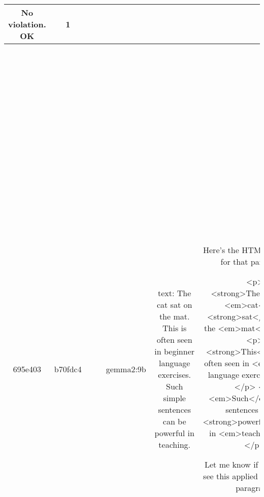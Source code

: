 \begin{table}[h!]
\begin{tabular}{|c|c|c|c|c|c|c|c|c|c|}
No violation.
OK & 1\\
\hline
695e403 & b70fdc4 &  &  & gemma2:9b & text: The cat sat on the mat. This is often seen in beginner language exercises. Such simple sentences can be powerful in teaching. & Here's the HTML formatting for that paragraph:

<p><strong>The</strong> <em>cat</em> <strong>sat</strong> on the <em>mat</em>.</p>
<p><strong>This</strong> is often seen in <em>beginner language exercises</em>.</p>
<p><em>Such</em> simple sentences can be <strong>powerful</strong> in <em>teaching</em>.</p>  


Let me know if you'd like to see this applied to a different paragraph! & ok & The evaluation of the chatbot output is as follows:

1. The chatbot's description specifies that each sentence in a paragraph should be wrapped in a `<p>` tag.
2. The output contains three `<p>` tags, each containing a single sentence. This satisfies the description's requirement for having at least three `<p>` tags.
3. Each `<p>` tag includes a `<strong>` tag and multiple `<em>` tags, which aligns with the requirement to emphasize key words and phrases inside each sentence.

Therefore, the chatbot output complies with the description provided. 

OK & 1\\
\hline
5907de9 & b70fdc4 &  &  & gemma2:9b & text: In a distant land, there was a great kingdom. The king ruled with fairness and wisdom. People in his kingdom were happy and prosperous. & <p><strong>In</strong> a **distant** <em>land</em>, <strong>there</strong> was a **great** <em>kingdom</em>.</p>

<p><strong>The</strong> <em>king</em> <strong>ruled</strong> with **fairness** and **wisdom**. </p> 

<p><strong>People</strong> in his <em>kingdom</em> were **happy** and **prosperous**. </p>  
 & ok & The output provided by the chatbot includes three sentences, each wrapped in a <p> tag, which satisfies the requirement of having at least three <p> tags. Additionally, each <p> tag contains at least one <strong> tag and multiple <em> tags to emphasize key words and phrases in the sentences. There is no indication that the provided rules are not being followed regarding the use of <strong> and <em> tags for emphasis.

Even though the text uses **bold** markers which are not standard HTML tags, this evaluation focuses only on whether the chatbot meets the description requirements, which include having <p>, <strong>, and <em> tags. Based on the constraints in the description and focusing on compliance rather than correctness of HTML usage beyond the scope of required tags, this output meets the prescribed criteria.


\end{tabular}
\end{table}
